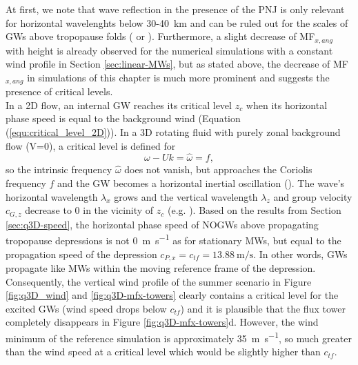 At first, we note that wave reflection in the presence of the PNJ is only relevant for horizontal wavelenghts below 30-\SI{40}{\kilo\meter} and can be ruled out for the scales of GWs above tropopause folds (\cite[]{gill_atmosphere-ocean_1982} or \cite[]{mixa_nonlinear_2021}). Furthermore, a slight decrease of MF$_{x,ang}$ with height is already observed for the numerical simulations with a constant wind profile in Section \ref{sec:linear-MWs}, but as stated above, the decrease of MF$_{x,ang}$ in simulations of this chapter is much more prominent and suggests the presence of critical levels.\\
In a 2D flow, an internal GW reaches its critical level $z_c$ when its horizontal phase speed is equal to the background wind (Equation (\ref{equ:critical_level_2D})). In a 3D rotating fluid with purely zonal background flow (V=0), a critical level is defined for 
\begin{equation}
    \omega - Uk = \hat{\omega} = f,
    \label{equ:critical_level}
\end{equation}
so the intrinsic frequency $\hat{\omega}$ does not vanish, but approaches the Coriolis frequency $f$ and the GW becomes a horizontal inertial oscillation (\cite{jones_propagation_1967}). The wave's horizontal wavelength $\lambda_x$ grows and the vertical wavelength $\lambda_z$ and group velocity $c_{G,z}$ decrease to 0 in the vicinity of $z_c$ (e.g. \cite[]{lin_mesoscale_2007}). Based on the results from Section \ref{sec:q3D-speed}, the horizontal phase speed of NOGWs above propagating tropopause depressions is not \SI{0}{\meter\per\second} as for stationary MWs, but equal to the propagation speed of the depression $c_{P,x}=c_{tf}=\SI{13.88}{\meter\per\second}$. In other words, GWs propagate like MWs within the moving reference frame of the depression. Consequently, the vertical wind profile of the summer scenario in Figure \ref{fig:q3D_wind} and \ref{fig:q3D-mfx-towers} clearly contains a critical level for the excited GWs (wind speed drops below $c_{tf}$) and it is plausible that the flux tower completely disappears in Figure \ref{fig:q3D-mfx-towers}d. However, the wind minimum of the reference simulation is approximately \SI{35}{\meter\per\second}, so much greater than the wind speed at a critical level which would be slightly higher than $c_{tf}$.

